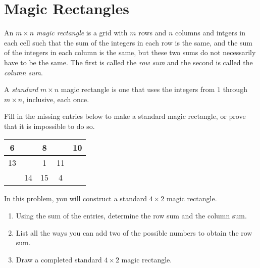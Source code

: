 \documentclass[11pt]{article}
\renewenvironment{problem}{\begin{problems}}{\end{problems}\vspace{5pt}}
\begin{document}
\section{Magic Rectangles}

\begin{definition}
An $m \times n$ \textit{magic rectangle} is a grid with $m$ rows and $n$ columns and intgers in each cell such that
the sum of the integers in each row is the same, and the sum of the integers in each column is the same,
but these two sums do not necessarily have to be the same.
The first is called the \textit{row sum} and the second is called the \textit{column sum}.
\end{definition}

\begin{definition}
A \textit{standard} $m \times n$ magic rectangle is one that uses the integers from $1$ through $m\times n$, inclusive, each once.
\end{definition}

\begin{problem}[3 points]
Fill in the missing entries below to make a standard magic rectangle, or prove that it is impossible to do so.
\begin{center}
\begin{tabular}{|c|c|c|c|c|}
\hline
6 & \phantom{7} & 8 & \phantom{9} & 10 \\ \hline
13 & \phantom{3} & 1 & 11 & \phantom{12} \\ \hline
\phantom{5} & 14 & 15 & 4 & \phantom{2} \\ \hline
\end{tabular}
\end{center}
\end{problem}

\begin{problem}[8=2+2+4 points]
In this problem, you will construct a standard $4 \times 2$ magic rectangle.
\begin{enumerate}[label=(\alph*)]
\item Using the sum of the entries, determine the row sum and the column sum.

\item List all the ways you can add two of the possible numbers to obtain the row sum.

\item Draw a completed standard $4 \times 2$ magic rectangle.
\end{enumerate}
\end{problem}
\end{document}
